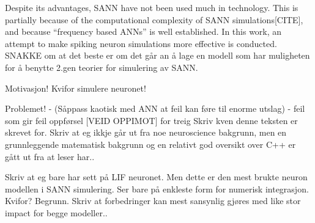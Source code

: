 \newpage

	Despite its advantages, SANN have not been used much in technology.  %
	This is partially because of the computational complexity of SANN simulations[CITE], 
		and because ``frequency based ANNs'' is well established.
	In this work, an attempt to make spiking neuron simulations more effective is conducted.
	SNAKKE om at det beste er om det går an å lage en modell som har muligheten for å benytte 2.gen teorier for simulering av SANN.


Motivasjon! Kvifor simulere neuronet!

Problemet!  - (Såppass kaotisk med ANN at feil kan føre til enorme utslag)
			- feil som gir feil oppførsel [VEID OPPIMOT]  for treig
Skriv kven denne teksten er skrevet for. Skriv at eg ikkje går ut fra noe neuroscience bakgrunn, men en grunnleggende matematisk bakgrunn og en relativt god oversikt over C++ er gått ut fra at leser har..


	

%
%	




	Skriv at eg bare har sett på LIF neuronet. Men dette er den mest brukte neuron modellen i SANN simulering.
	Ser bare på enkleste form for numerisk integrasjon. Kvifor? Begrunn. Skriv at forbedringer kan mest sansynlig gjøres med like stor impact for begge modeller..



%


